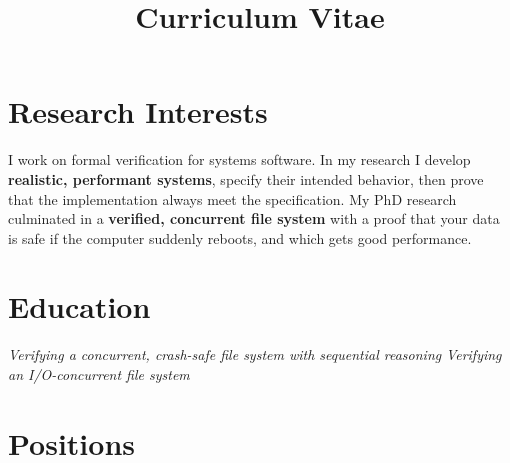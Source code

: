 \documentclass[11pt,a4paper,roman]{moderncv}   %
\title{Curriculum Vitae}               %
\begin{document}
\makecvtitle

\section{Research Interests}

I work on formal verification for systems software. In my research I develop
\textbf{realistic, performant systems}, specify their intended behavior, then prove that
the implementation always meet the specification. My PhD research culminated in
a \textbf{verified, concurrent file system} with a proof that your data is
safe if the computer suddenly reboots, and which gets good performance.

\section{Education}
%
{\emph{Verifying a concurrent, crash-safe file system with sequential reasoning}}{}
%
{\emph{Verifying an I/O-concurrent file system}}{}

\section{Positions}


\newcommand{\cvpub}[3]{\cvline{#1}{\textbf{#2} \endgraf {\small #3}}}
\newcommand{\selfauthor}{\emph{Tej Chajed}}
\end{document}

